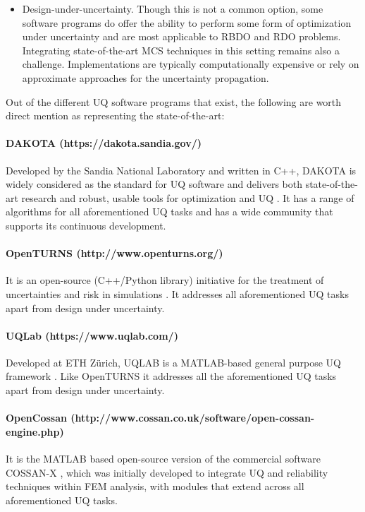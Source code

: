 \begin{itemize}
    \item Design-under-uncertainty. Though this is not a common option, some software programs do offer the ability to perform some form of optimization under uncertainty and are most applicable to RBDO and RDO problems. Integrating state-of-the-art MCS techniques in this setting remains also a challenge. Implementations are typically computationally expensive or rely on approximate approaches for the uncertainty propagation.
\end{itemize}

\noindent Out of the different UQ software programs that exist, the following are worth direct mention as representing the state-of-the-art: 

\paragraph{DAKOTA (https://dakota.sandia.gov/)} Developed by the Sandia National Laboratory and written in C++, DAKOTA is widely considered as the standard for UQ software and delivers both state-of-the-art research and robust, usable tools for optimization and UQ \citep{adams2009dakota}. It has a range of algorithms for all aforementioned UQ tasks and has a wide community that supports its continuous development. 

\paragraph{OpenTURNS (http://www.openturns.org/)} It is an open-source (C++/Python library) initiative for the treatment of uncertainties and risk in simulations \citep{andrianov2007open}. It addresses all aforementioned UQ tasks apart from design under uncertainty. 

\paragraph{UQLab (https://www.uqlab.com/)} Developed at ETH Zürich, UQLAB is a MATLAB-based general purpose UQ framework \citep{marelli2014uqlab}. Like OpenTURNS it addresses all the aforementioned UQ tasks apart from design under uncertainty. 

\paragraph{OpenCossan (http://www.cossan.co.uk/software/open-cossan-engine.php)} It is the MATLAB based open-source version of the commercial software COSSAN-X \citep{patelli2017cossan}, which was initially developed to integrate UQ and reliability techniques within FEM analysis, with modules that extend across all aforementioned UQ tasks.

